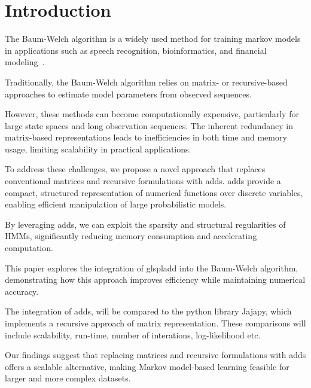 
\section{Introduction}\label{sec:introduction}
The Baum-Welch algorithm is a widely used method for training markov models in applications such as speech recognition, bioinformatics, and financial modeling~\cite{chavan2013overview,ciocchetta2009bio,mamon2007hidden}.

Traditionally, the Baum-Welch algorithm relies on matrix- or recursive-based approaches to estimate model parameters from observed sequences.

However, these methods can become computationally expensive, particularly for large state spaces and long observation sequences.
The inherent redundancy in matrix-based representations leads to inefficiencies in both time and memory usage, limiting scalability in practical applications.

To address these challenges, we propose a novel approach that replaces conventional matrices and recursive formulations with \glspl{add}.
\glspl{add} provide a compact, structured representation of numerical functions over discrete variables, enabling efficient manipulation of large probabilistic models.

By leveraging \glspl{add}, we can exploit the sparsity and structural regularities of HMMs, significantly reducing memory consumption and accelerating computation.

This paper explores the integration of glspl{add} into the Baum-Welch algorithm, demonstrating how this approach improves efficiency while maintaining numerical accuracy.

The integration of \glspl{add}, will be compared to the python library Jajapy, which implements a recursive approach of matrix representation.
These comparisons will include scalability, run-time, number of interations, log-likelihood etc.

Our findings suggest that replacing matrices and recursive formulations with \glspl{add} offers a scalable alternative, making Markov model-based learning feasible for larger and more complex datasets.
